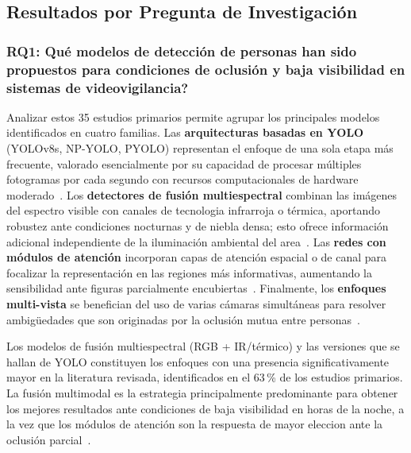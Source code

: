\documentclass[12pt, a4paper]{article}
\begin{document}
\normalsize

\subsection{Resultados por Pregunta de Investigaci\'{o}n}

\subsubsection{RQ1: \textquestiondown Qu\'{e} modelos de detecci\'{o}n
de personas han sido propuestos para condiciones de oclusi\'{o}n y baja
visibilidad en sistemas de videovigilancia?}

Analizar estos 35 estudios primarios permite agrupar los principales
modelos identificados en cuatro familias. Las
\textbf{arquitecturas basadas en YOLO} (YOLOv8s, NP-YOLO, PYOLO)
representan el enfoque de una sola etapa m\'{a}s frecuente, valorado esencialmente
por su capacidad de procesar m\'{u}ltiples fotogramas por cada segundo con
recursos computacionales de hardware moderado~\cite{E21,E18,E12,E23}. Los
\textbf{detectores de fusi\'{o}n multiespectral} combinan las im\'{a}genes
del espectro visible con canales de tecnologia infrarroja o t\'{e}rmica, aportando
robustez ante condiciones nocturnas y de niebla densa; esto ofrece
informaci\'{o}n adicional independiente de la iluminaci\'{o}n
ambiental del area~\cite{E35,E31,E19,E17,E07,E04,E26}. Las \textbf{redes con
m\'{o}dulos de atenci\'{o}n} incorporan capas de atenci\'{o}n espacial
o de canal para focalizar la representaci\'{o}n en las regiones m\'{a}s
informativas, aumentando la sensibilidad ante figuras parcialmente
encubiertas~\cite{E25, E05, E14}. Finalmente, los \textbf{enfoques
multi-vista} se benefician del uso de varias c\'{a}maras simult\'{a}neas
para resolver ambig\"{u}edades que son originadas por la oclusi\'{o}n mutua
entre personas~\cite{E09, E30, E10}.

\begin{hallazgo}[]
  Los modelos de fusi\'{o}n multiespectral (RGB + IR/t\'{e}rmico) y las
  versiones que se hallan de YOLO constituyen los enfoques con una
  presencia significativamente mayor en la literatura revisada, identificados en el 63\,\% de
  los estudios primarios. La fusi\'{o}n multimodal es la estrategia principalmente
  predominante para obtener los mejores resultados ante condiciones de  baja visibilidad
  en horas de la noche, a la vez que los m\'{o}dulos de atenci\'{o}n son la
  respuesta de mayor eleccion ante la oclusi\'{o}n
  parcial~\cite{E35, E31, E17, E19, E07, E26}.
\end{hallazgo}
\end{document}
